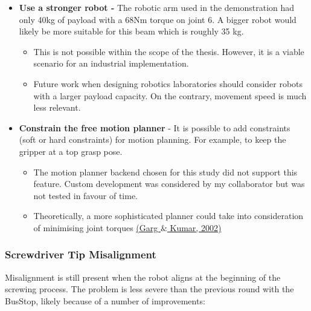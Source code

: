 \documentclass[11pt]{book}
\begin{document}
\begin{itemize}
	\item \textbf{Use a stronger robot - }The robotic arm used in the demonstration had only 40kg of payload with a 68Nm torque on joint 6. A bigger robot would likely be more suitable for this beam which is roughly 35 kg.

\begin{itemize}
	\item This is not possible within the scope of the thesis. However, it is a viable scenario for an industrial implementation.

	\item Future work when designing robotics laboratories should consider robots with a larger payload capacity. On the contrary, movement speed is much less relevant.

\end{itemize}
	\item \textbf{Constrain the free motion planner} - It is possible to add constraints (soft or hard constraints) for motion planning. For example, to keep the gripper at a top grasp pose.

\begin{itemize}
	\item The motion planner backend chosen for this study did not support this feature. Custom development was considered by my collaborator but was not tested in favour of time.

	\item Theoretically, a more sophisticated planner could take into consideration of minimising joint torques \href{https://www.zotero.org/google-docs/?ilmsmO}{(Garg $\&$ Kumar, 2002)}

\end{itemize}
\end{itemize}
\vspace{1\baselineskip}
\subsubsection{Screwdriver Tip Misalignment}

Misalignment is still present when the robot aligns at the beginning of the screwing process. The problem is less severe than the previous round with the BusStop, likely because of a number of improvements:
\end{document}

